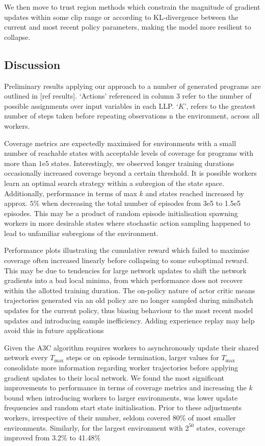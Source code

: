 \documentclass[conference,compsoc]{IEEEtran}
\begin{document}
We then move to trust region methods which constrain the magnitude of gradient updates within some clip range or according to KL-divergence between the current and most recent policy parameters, making the model more resilient to collapse. 

%
\subsection{Discussion}
Preliminary results applying our approach to a number of generated programs are outlined in [ref results]. `Actions' referenced in column 3 refer to the number of possible assignments over input variables in each LLP. `$K$', refers to the greatest number of steps taken before repeating observations n the environment, across all workers.

Coverage metrics are expectedly maximised for environments with a small number of reachable states with acceptable levels of coverage for programs with more than $1\mathrm{e}{5}$ states. Interestingly, we observed longer training durations occasionally increased coverage beyond a certain threshold. It is possible workers learn an optimal search strategy within a subregion of the state space. Additionally, performance in terms of max $k$ and states reached increased by approx. $5\%$ when decreasing the total number of episodes from 3e5 to 1.5e5 episodes.  This may be a product of random episode initialisation spawning workers in more desirable states where stochastic action sampling happened to lead to unfamiliar subregions of the environment.

Performance plots illustrating the cumulative reward  which failed to maximise coverage often increased linearly before collapsing to some suboptimal reward.  This may be due to tendencies for large network updates to shift the network gradients into a bad local minima, from which performance does not recover within the allotted training duration. The on-policy nature of actor critic means trajectories generated via an old policy are no longer sampled during minibatch updates for the current policy,  thus biasing behaviour to the most recent model updates and introducing sample inefficiency. Adding experience replay \cite{wang2017sample} may help avoid this in future applications

Given the A3C algorithm requires workers to asynchronously update their shared network every $T_{\max}$ steps or on episode termination, larger values for $T_{\max}$ consolidate more information regarding worker trajectories before applying gradient updates to their local network. We found the most significant improvements to performance in terms of coverage metrics and increasing the $k$ bound when introducing workers to larger environments, was lower update frequencies and random start state initialisation. Prior to these adjustments workers, irrespective of their number, seldom covered 80\% of most smaller environments. Similarly, for the largest environment with $2^{50}$ states, coverage improved from 3.2\% to 41.48\%
\end{document}
